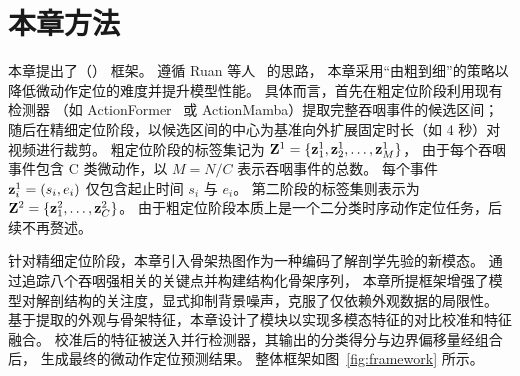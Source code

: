 \section{本章方法}

本章提出了\fullname （\sexyname） 框架。
遵循 Ruan 等人~\cite{ruan2023temporal} 的思路，
本章采用“由粗到细”的策略以降低微动作定位的难度并提升模型性能。
具体而言，首先在粗定位阶段利用现有检测器
（如 ActionFormer~\cite{zhang2022actionformer} 
或 ActionMamba\cite{chen2024video}）提取完整吞咽事件的候选区间；
随后在精细定位阶段，以候选区间的中心为基准向外扩展固定时长（如 4 秒）对视频进行裁剪。
粗定位阶段的标签集记为 \(\mathbf{Z}^{1}=\{\mathbf{z}^1_1,\mathbf{z}^1_2,\ldots,\mathbf{z}^1_M\}\)，
由于每个吞咽事件包含 C 类微动作，以 \(M = N/C\) 表示吞咽事件的总数。
每个事件 \(\mathbf{z}^1_i=(s_i,e_i)\) 仅包含起止时间 \(s_i\) 与 \(e_i\)。
第二阶段的标签集则表示为 \(\mathbf{Z}^2 = \{\mathbf{z}^2_1, \dots, \mathbf{z}^2_C\}\)。
由于粗定位阶段本质上是一个二分类时序动作定位任务，后续不再赘述。

针对精细定位阶段，本章引入骨架热图作为一种编码了解剖学先验的新模态。
通过追踪八个吞咽强相关的关键点并构建结构化骨架序列，
本章所提框架增强了模型对解剖结构的关注度，显式抑制背景噪声，克服了仅依赖外观数据的局限性。
基于提取的外观与骨架特征，本章设计了\crossblockfull 模块以实现多模态特征的对比校准和特征融合。
校准后的特征被送入并行检测器，其输出的分类得分与边界偏移量经组合后，
生成最终的微动作定位预测结果。
整体框架如图~\ref{fig:framework} 所示。

